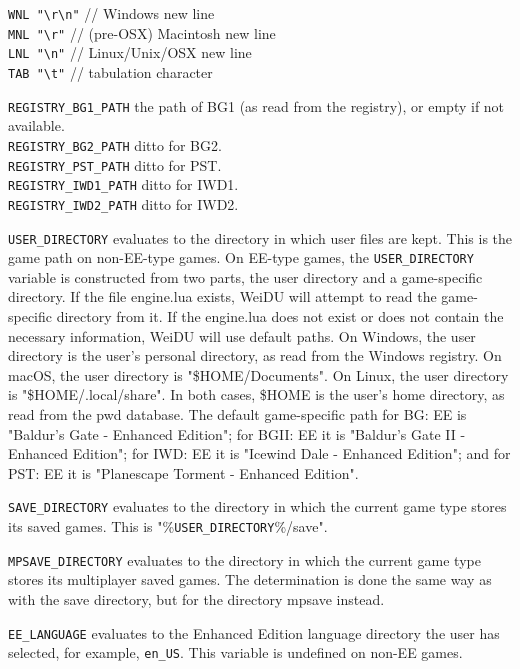 \documentclass{article}
\def\t#1{{\tt #1}}
\begin{document}
\verb+WNL "\r\n"+ // Windows new line\\
\verb+MNL "\r"+ // (pre-OSX) Macintosh new line\\
\verb+LNL "\n"+ // Linux/Unix/OSX new line\\
\verb+TAB "\t"+ // tabulation character

\verb+REGISTRY_BG1_PATH+ the path of BG1 (as read from the registry),
or empty if not available.\\

\verb+REGISTRY_BG2_PATH+ ditto for BG2.\\
\verb+REGISTRY_PST_PATH+ ditto for PST.\\
\verb+REGISTRY_IWD1_PATH+ ditto for IWD1.\\
\verb+REGISTRY_IWD2_PATH+ ditto for IWD2.

\verb+USER_DIRECTORY+ evaluates to the directory in which user files
are kept. This is the game path on non-EE-type games. On EE-type
games, the \verb+USER_DIRECTORY+ variable is constructed from two
parts, the user directory and a game-specific directory. If the file
engine.lua exists, WeiDU will attempt to read the game-specific
directory from it. If the engine.lua does not exist or does not
contain the necessary information, WeiDU will use default paths.  On
Windows, the user directory is the user's personal directory, as read
from the Windows registry. On macOS, the user directory is
"\$HOME/Documents". On Linux, the user directory is
"\$HOME/.local/share". In both cases, \$HOME is the user's home
directory, as read from the pwd database. The default game-specific
path for BG: EE is "Baldur's Gate - Enhanced Edition"; for BGII: EE it
is "Baldur's Gate II - Enhanced Edition"; for IWD: EE it is
"Icewind Dale - Enhanced Edition"; and for PST: EE it is
"Planescape Torment - Enhanced Edition".

\verb+SAVE_DIRECTORY+ evaluates to the directory in which the current
game type stores its saved games. This is
"\%\verb+USER_DIRECTORY+\%/save".

\verb+MPSAVE_DIRECTORY+ evaluates to the directory in which the
current game type stores its multiplayer saved games. The
determination is done the same way as with the save directory, but for
the directory mpsave instead.

\verb+EE_LANGUAGE+ evaluates to the Enhanced Edition language
directory the user has selected, for example, \verb+en_US+. This
variable is undefined on non-EE games.

\end{document}
